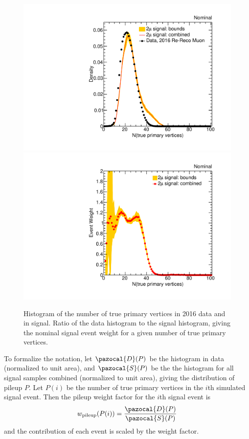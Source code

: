\begin{figure}[htpb]
  \centering
  \includegraphics[width=\DSquareWidth]{figures/displaced/PU_distributionNom.pdf}
  \hspace*{-2em}
  \includegraphics[width=\DSquareWidth]{figures/displaced/PU_weightNom.pdf}
  \caption[Histograms of the number of true primary vertices in 2016 data and in \twoMu signal, and graph of their ratios.]{ Histogram of the number of true primary vertices in 2016 data and in \twoMu signal.  Ratio of the data histogram to the signal histogram, giving the nominal signal event weight for a given number of true primary vertices.}
  \label{fig:dd:pileup}
\end{figure}

\pagebreak
To formalize the notation, let $\pazocal{D}(P)$ be the histogram in data (normalized to unit area), and $\pazocal{S}(P)$ be the the histogram for all signal samples combined (normalized to unit area), giving the distribution of pileup $P$.
Let $P(i)$ be the number of true primary vertices in the $i$th simulated signal event.
Then the pileup weight factor for the $i$th signal event is
\begin{equation}
  w_\text{pileup}(P(i)) = \frac{\pazocal{D}(P)}{\pazocal{S}(P)}
  \label{eq:dd:pileupweight}
\end{equation}
and the contribution of each event is scaled by the weight factor.

